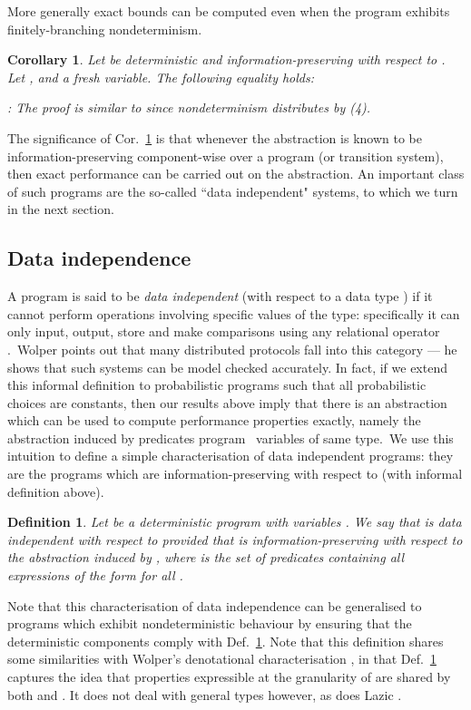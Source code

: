\documentclass[numbers,copyright,creativecommons]{eptcs}
\newcommand{\Cor}[1]{Cor.~\ref{#1}}
\newtheorem{Defns}{Definition}\newtheorem{Corl}{Corollary}\newcommand{\Def}[1]{Def.~\ref{#1}}
\newcommand{\Proof}{\noindent{\bf Proof}: \quad}
\begin{document}
More generally exact bounds can be computed even when the program exhibits finitely-branching nondeterminism.

\begin{Corl}\label{c1021}
Let  be deterministic and information-preserving with respect to . Let , and  a fresh variable. The following equality holds:


\Proof
The proof is similar to  since nondeterminism distributes by  (4).
\end{Corl}

The significance of \Cor{c1021} is that whenever the abstraction is known to be information-preserving component-wise over a program (or transition system), then exact performance can be carried out on the abstraction. An important class of such programs are the so-called ``data independent" systems, to which we turn in the next section.

\subsection{Data independence}

A program is said to be \emph{data independent} (with respect to a data type ) \cite{Wolper86} if it cannot perform operations involving specific values of  the type: specifically it can only input, output, store and make comparisons using any relational operator  .\ Wolper points out that many distributed protocols fall into this category --- he shows that such systems can be model checked accurately.  In fact, if we extend this informal definition to probabilistic programs such that all probabilistic choices are constants, then our results above imply that there is an abstraction which can be used to compute performance properties exactly, namely the abstraction induced by predicates program \ variables of same type.\ We use this intuition to define a simple characterisation of data independent programs: they are the programs which are information-preserving with respect to   (with informal definition above).

 \begin{Defns}\label{d1100}
 Let  be a deterministic  program with variables . We say that  is \emph{data independent} with respect to  provided that  is information-preserving with respect to the abstraction induced by , where  is the set of predicates containing all expressions of the form  for all .
 \end{Defns}

\noindent Note that this characterisation of data independence can be generalised to programs  which exhibit nondeterministic behaviour by ensuring that the deterministic components  comply with \Def{d1100}. Note that this definition shares some similarities with Wolper's denotational characterisation \cite{Wolper86}, in that \Def{d1100} captures the idea that properties expressible at the granularity of  are shared by both  and .  It does not deal with general types however, as does Lazic \cite{Lazic99}.
\end{document}
